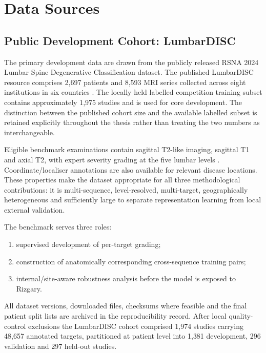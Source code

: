 \section{Data Sources}
\label{sec:method-data}

\subsection{Public Development Cohort: LumbarDISC}
\label{sec:method-lumbardisc}

The primary development data are drawn from the publicly released RSNA 2024
Lumbar Spine Degenerative Classification dataset. The published LumbarDISC
resource comprises 2,697 patients and 8,593 MRI series collected across eight
institutions in six countries \cite{richards2026the}. The locally held labelled
competition training subset contains approximately 1,975 studies and is used for
core development. The distinction between the published cohort size and the
available labelled subset is retained explicitly throughout the thesis rather
than treating the two numbers as interchangeable.

Eligible benchmark examinations contain sagittal T2-like imaging, sagittal T1
and axial T2, with expert severity grading at the five lumbar levels
\cite{rsna2024rsna,richards2026the}. Coordinate/localiser annotations are also
available for relevant disease locations. These properties make the dataset
appropriate for all three methodological contributions: it is multi-sequence,
level-resolved, multi-target, geographically heterogeneous and sufficiently
large to separate representation learning from local external validation.

The benchmark serves three roles:

\begin{enumerate}
  \item supervised development of per-target grading;
  \item construction of anatomically corresponding cross-sequence training pairs;
  \item internal/site-aware robustness analysis before the model is exposed to
        Rizgary.
\end{enumerate}

All dataset versions, downloaded files, checksums where feasible and the final
patient split lists are archived in the reproducibility record. After local
quality-control exclusions the LumbarDISC cohort comprised 1{,}974 studies
carrying 48{,}657 annotated targets, partitioned at patient level into 1{,}381
development, 296 validation and 297 held-out studies.

